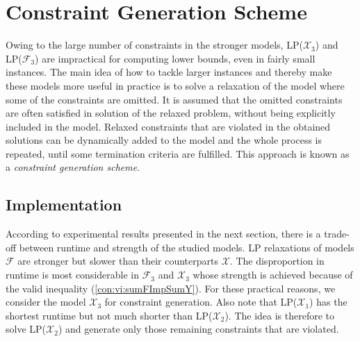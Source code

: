 \section{Constraint Generation Scheme}
\label{sec:cg}
Owing to the large number of constraints in the stronger models, LP($\mathcal{X}_3$) and LP($\mathcal{F}_3$) are impractical for computing lower bounds, even in fairly small instances.
The main idea of how to tackle larger instances and thereby make these models more useful in practice is to solve a relaxation of the model where some of the constraints are omitted.
It is assumed that the omitted constraints are often satisfied in solution of the relaxed problem, without being explicitly included in the model.
Relaxed constraints that are violated in the obtained solutions can be dynamically added to the model and the whole process is repeated, until some termination criteria are fulfilled.
This approach is known as a \emph{constraint generation scheme}.

\subsection{Implementation}%

According to experimental results presented in the next section, there is a trade-off between runtime and strength of the studied models.
LP relaxations of models $\mathcal{F}$ are stronger but slower than their counterparts $\mathcal{X}$.
The disproportion in runtime is most considerable in $\mathcal{F}_3$ and $\mathcal{X}_3$ whose strength is achieved because of the valid inequality (\ref{con:vi:sumFImpSumY}). 
For these practical reasons, we consider the model $\mathcal{X}_3$ for constraint generation.
Also note that LP($\mathcal{X}_1$) has the shortest runtime but not much shorter than LP($\mathcal{X}_2$).
The idea is therefore to solve LP($\mathcal{X}_2$) and generate only those remaining constraints that are violated.

